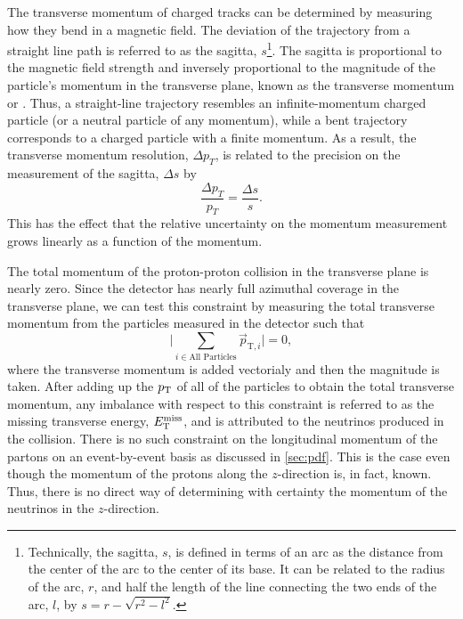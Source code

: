 The transverse momentum of charged tracks can be determined by measuring how they 
bend in a magnetic field. The deviation of the trajectory
from a straight line path is referred to as the 
sagitta, $s$\footnote{Technically, the sagitta, $s$, is defined in terms
of an arc as the distance from the center of the arc to the center of its
base. It can be related to the radius of the arc, $r$, and half the length
of the line connecting the two ends of the arc, $l$, by 
$s=r-\sqrt{r^2-l^2}$.}. The sagitta is proportional to the magnetic
field strength and inversely proportional to the magnitude
of the particle's momentum in the transverse plane, known
as the transverse momentum or \pt.
Thus, a straight-line trajectory resembles an infinite-momentum charged
particle (or a neutral particle of any momentum), while
a bent trajectory corresponds to a charged particle with a finite momentum.
As a result, the transverse momentum resolution, $\Delta p_T$, is related to the 
precision on the measurement of the sagitta, $\Delta s$ by
\begin{equation}
\frac{\Delta p_T }{p_T} = \frac{\Delta s}{s} .
\label{eq:sagitta}
\end{equation}
This has the effect that the relative uncertainty on the momentum
measurement grows linearly as a function of the momentum.


The total momentum of the proton-proton collision in the transverse
plane is nearly zero. Since the detector has nearly full azimuthal coverage 
in the transverse plane, we can test this constraint by measuring
the total transverse momentum from the particles measured in the detector
such that
\begin{equation}
\Bigg| \sum_{i\in\textrm{All Particles}} \vec{p}_{\textrm{T},i} \Bigg| = 0,
\end{equation}
where the transverse momentum is added vectorialy and then
the magnitude is taken.
After adding up the $p_{\mathrm{T}}$ of all of the particles to obtain
the total transverse momentum, 
any imbalance with respect to this constraint
is referred to as the
missing transverse energy, $E_{\mathrm{T}}^{\mathrm{miss}}$, and is attributed to the 
neutrinos produced in the collision. 
There is no such constraint on the longitudinal momentum of the partons
on an event-by-event basis
as discussed in \sec\ref{sec:pdf}.
This is the case
even though the momentum of the protons along the $z$-direction
is, in fact, known.
Thus, there is no direct way of determining with certainty the 
momentum of the neutrinos in the $z$-direction.



